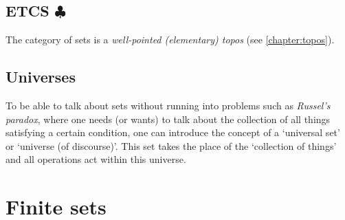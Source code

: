 
\subsection{\texorpdfstring{ETCS $\clubsuit$}{ETCS}}


    \begin{axiom}
        The category of sets is a \textit{well-pointed (elementary) topos} (see \cref{chapter:topos}).
    \end{axiom}


\subsection{Universes}\label{section:universes}

    To be able to talk about sets without running into problems such as \textit{Russel's paradox}, where one needs (or wants) to talk about the collection of all things satisfying a certain condition, one can introduce the concept of a `universal set' or `universe (of discourse)'. This set takes the place of the `collection of things' and all operations act within this universe.


\section{Finite sets}


